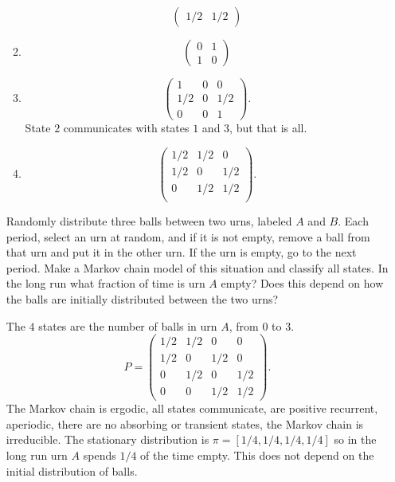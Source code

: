 \documentclass[12pt]{article}
\begin{document}
\begin{enumerate}
\begin{solution}
\begin{enumerate}[label=(\alph*)]
\[\begin{pmatrix}
                1/2 & 1/2
            \end{pmatrix}
        \]
    \item
        \[
            \begin{pmatrix}
                0 & 1 \\
                1 & 0
            \end{pmatrix}
        \]
    \item
        \[
            \begin{pmatrix}
                1 & 0 & 0 \\
                1/2 & 0 & 1/2 \\
                0 &0 & 1
            \end{pmatrix}
            .
        \] State \( 2 \) communicates with states \( 1 \) and \( 3 \),
        but that is all.
    \item
        \[
            \begin{pmatrix}
                1/2 & 1/2 & 0 \\
                1/2 & 0 & 1/2 \\
                0 & 1/2 & 1/2 \\
            \end{pmatrix}
            .
        \]
\end{enumerate}
\end{solution}

\begin{exercise}
    Randomly distribute three balls between two urns, labeled \( A \)
    and \( B \).  Each period, select an urn at random, and if it is not
    empty, remove a ball from that urn and put it in the other
    urn. If the urn is empty, go to the next period. Make
    a Markov chain model of this situation and classify all states. In
    the long run what fraction of time is urn \( A \) empty?  Does this
    depend on how the balls are initially distributed between the two
    urns?
\end{exercise}
\begin{solution}
    The \( 4 \) states are the number of balls in urn \( A \), from \( 0
    \) to \( 3 \).
    \[
        P =
        \begin{pmatrix}
            1/2 & 1/2 & 0 & 0 \\
            1/2 & 0 & 1/2 & 0 \\
            0 & 1/2 & 0 & 1/2 \\
            0 & 0 & 1/2 & 1/2
        \end{pmatrix}
        .
    \] The Markov chain is ergodic, all states communicate, are positive
    recurrent, aperiodic, there are no absorbing or transient states,
    the Markov chain is irreducible.  The stationary distribution is \(
    \pi = [1/4, 1/4, 1/4, 1/4] \) so in the long run urn \( A \) spends \(
    1/4 \) of the time empty.  This does not depend on the initial
    distribution of balls.
\end{solution}


\end{enumerate}
\end{document}
